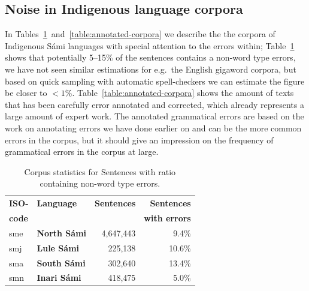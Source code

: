 \documentclass[free]{flammie}
\begin{document}
\subsection{Noise in Indigenous language corpora}

In Tables~\ref{table:error-corpora}~and~\ref{table:annotated-corpora} we
describe the the corpora of Indigenous Sámi languages with special attention to
the errors within; Table~\ref{table:error-corpora} shows that potentially
5--15\% of the sentences contains a non-word type errors, we have not
seen similar estimations for e.g.\ the English gigaword corpora, but based on
quick sampling with automatic spell-checkers we can estimate the figure be
closer to $<1\%$.  Table~\ref{table:annotated-corpora} shows the
amount of texts that has been carefully error annotated and corrected, which
already represents a large amount of expert work.  The annotated grammatical
errors are based on the work on annotating errors we have done earlier on and
can be the more common errors in the corpus, but it should give an impression on
the frequency of grammatical errors in the corpus at large.

\begin{table}[!ht]
\begin{center}
\begin{tabularx}{\columnwidth}{Xlrr}

      \toprule
      \bf ISO- & \bf Language & \bf Sentences & \bf Sentences\\
      \bf code &&& \bf with errors\\

      \midrule
      sme & \bf North Sámi & 4,647,443 & 9.4\%\\
      \midrule
      smj & \bf Lule Sámi & 225,138 & 10.6\%\\
      \midrule
     sma & \bf South Sámi & 302,640 & 13.4\%\\
      \midrule
     smn & \bf Inari Sámi & 418,475 & 5.0\% \\
      \bottomrule
\end{tabularx}
\caption{\label{table:error-corpora} Corpus statistics for Sentences with ratio
    containing non-word type errors.}
 \end{center}
\end{table}
\end{document}
